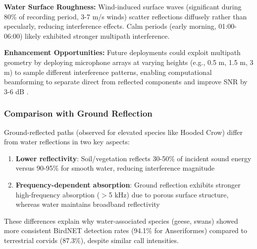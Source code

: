 \documentclass[twocolumn]{article}
\begin{document}
\textbf{Water Surface Roughness:} Wind-induced surface waves (significant during 80\% of recording period, 3-7 m/s winds) scatter reflections diffusely rather than specularly, reducing interference effects. Calm periods (early morning, 01:00-06:00) likely exhibited stronger multipath interference.

\textbf{Enhancement Opportunities:} Future deployments could exploit multipath geometry by deploying microphone arrays at varying heights (e.g., 0.5 m, 1.5 m, 3 m) to sample different interference patterns, enabling computational beamforming to separate direct from reflected components and improve SNR by 3-6 dB \citep{Blumstein2011}.

\subsubsection{Comparison with Ground Reflection}

Ground-reflected paths (observed for elevated species like Hooded Crow) differ from water reflections in two key aspects:

\begin{enumerate}
\item \textbf{Lower reflectivity}: Soil/vegetation reflects 30-50\% of incident sound energy versus 90-95\% for smooth water, reducing interference magnitude

\item \textbf{Frequency-dependent absorption}: Ground reflection exhibits stronger high-frequency absorption ($>$5 kHz) due to porous surface structure, whereas water maintains broadband reflectivity
\end{enumerate}

These differences explain why water-associated species (geese, swans) showed more consistent BirdNET detection rates (94.1\% for Anseriformes) compared to terrestrial corvids (87.3\%), despite similar call intensities.
\end{document}
